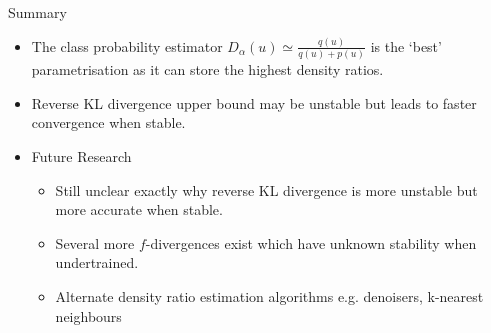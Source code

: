\documentclass[handout]{beamer}
\begin{document}
\begin{frame}{Summary}
  \begin{itemize}
  \item
    The class probability estimator $D_\alpha(u)\simeq\frac{q(u)}{q(u)+p(u)}$ is the `best' parametrisation as it can store the \alert{highest density ratios}.
  \item
    Reverse KL divergence upper bound may be \alert{unstable} but leads to \alert{faster convergence} when stable.
  \end{itemize}
  
  \begin{itemize}
  \item
    Future Research
    \begin{itemize}
    \item
      Still unclear exactly why reverse KL divergence is more unstable but more accurate when stable.
    \item
      Several more $f$-divergences exist which have unknown stability when undertrained.
    \item Alternate density ratio estimation algorithms e.g. denoisers, k-nearest neighbours
    \end{itemize}
  \end{itemize}
\end{frame}



%
%    
%    
%
% 
%    
%
\end{document}
